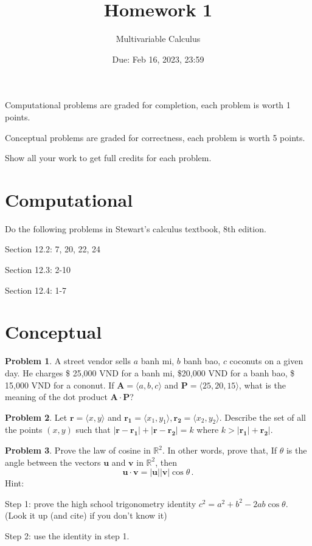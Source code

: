 \documentclass[12pt]{article}
\title{Homework 1}
\author{ Multivariable Calculus}
\date{Due: Feb 16, 2023, 23:59}
\newcommand{\vect}{\mathbf}
\theoremstyle{definition}
\newtheorem{problem}{Problem}
\begin{document}
\maketitle

Computational problems are graded for completion, each problem is worth 1 points.

Conceptual problems are graded for correctness, each problem is worth 5 points.

Show all your work to get full credits for each problem.
\section{Computational}
Do the following problems in Stewart's calculus textbook, 8th edition.

Section 12.2: 7, 20, 22, 24

Section 12.3: 2-10

Section 12.4: 1-7

\section{Conceptual}

\begin{problem}
    A street vendor sells $a$ banh mi, $b$ banh bao, $c$ coconuts
    on a given day.
    He charges \$ 25,000 VND for a banh mi, \$20,000 VND for a banh bao, 
    \$ 15,000 VND for a cononut.
    If $\vect{A} = \langle a,b,c \rangle$ and $\vect{P} = \langle 25, 20,15 \rangle$, what is the meaning of the dot product $\vect{A}\cdot \vect{P}$?
\end{problem}

\begin{problem}
    Let $\vect{r} = \langle x,y \rangle$ and 
    $\vect{r_1} = \langle x_1, y_1 \rangle, 
    \vect{r_2} = \langle x_2, y_2 \rangle$.
    Describe the set of all the points $(x,y)$
    such that
    $| \vect{r}- \vect{r_1} | + | \vect{r} - \vect{r_2} | = k$
    where 
    $k > | \vect{r_1} | + \vect{r_2}|$.
\end{problem}

\begin{problem}
     Prove the law of cosine in $\mathbb{R}^2$. In other words,
        prove that, 
        If $\theta$ is the angle between the vectors $\textbf{u}$ and $\textbf{v}$ in $\mathbb{R}^2$, then
   \begin{equation*}
        \textbf{u}\cdot \textbf{v} = |\textbf{u}|| \textbf{v}| \cos \theta \,.
   \end{equation*}
 Hint: 

 Step 1: prove the high school trigonometry identity $c^2 = a^2 + b^2 - 2ab\cos\theta$. (Look it up (and cite) if you don't know it)

 Step 2: use the identity in step 1.

\end{problem}
\end{document}
